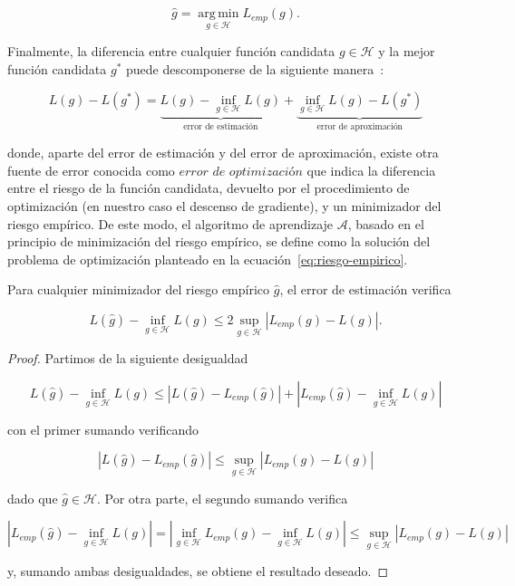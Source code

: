 \begin{equation}\label{eq:riesgo-empirico}
    \hat{g} = \operatorname*{\arg \,\min}_{g \in \mathcal{H}} L_{emp}(g). 
\end{equation}\newline

Finalmente, la diferencia entre cualquier función candidata $g \in \mathcal{H}$ y la mejor función candidata $g^{*}$ puede descomponerse de la siguiente manera~\cite{Lafon2024}:

\[
L(g) - L(g^{*}) = \underbrace{L(g) - \inf_{g \in \mathcal{H}} L(g)}_{\text{error de estimación}} + \underbrace{\inf_{g \in \mathcal{H}} L(g) - L(g^{*})}_{\text{error de aproximación}}
\]

donde, aparte del error de estimación y del error de aproximación, existe otra fuente de error conocida como $\textit{error de optimización}$ que indica la diferencia entre el riesgo de la función candidata, devuelto por el procedimiento de optimización (en nuestro caso el descenso de gradiente), y un minimizador del riesgo empírico. De este modo, el algoritmo de aprendizaje $\mathcal{A}$, basado en el principio de minimización del riesgo empírico, se define como la solución del problema de optimización planteado en la ecuación~\eqref{eq:riesgo-empirico}.\newline

\begin{proposicion}\label{prop:min-riesgo-empirico}
    Para cualquier minimizador del riesgo empírico $\hat{g}$, el error de estimación verifica

    \[ L(\hat{g}) - \inf_{g \in \mathcal{H}}L(g) \leq 2 \sup_{g \in \mathcal{H}}|L_{emp}(g) - L(g)|. \]\newline
\end{proposicion}

\begin{proof}
    Partimos de la siguiente desigualdad

    \[ L(\hat{g}) - \inf_{g \in \mathcal{H}}L(g) \leq  |L(\hat{g}) - L_{emp}(\hat{g})| + |L_{emp}(\hat{g}) - \inf_{g \in \mathcal{H}}L(g)| \]

    con el primer sumando verificando

    \[ |L(\hat{g}) - L_{emp}(\hat{g})| \leq \sup_{g \in \mathcal{H}}|L_{emp}(g) - L(g)|\]

    dado que $\hat{g} \in \mathcal{H}$. Por otra parte, el segundo sumando verifica

    \[ |L_{emp}(\hat{g}) - \inf_{g \in \mathcal{H}}L(g)| = |\inf_{g \in \mathcal{H}} L_{emp}(g) - \inf_{g \in \mathcal{H}}L(g)| \leq \sup_{g \in \mathcal{H}}|L_{emp}(g) - L(g)| \]

    y, sumando ambas desigualdades, se obtiene el resultado deseado.\newline
\end{proof}

